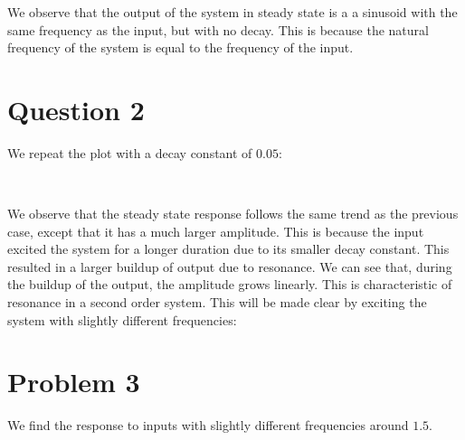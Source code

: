\documentclass[11pt]{article}
\begin{document}
	
		
    We observe that the output of the system in steady state is a a sinusoid
with the same frequency as the input, but with no decay. This is because
the natural frequency of the system is equal to the frequency of the
input.

	

	
		
    \section{Question 2}\label{question-2}

We repeat the plot with a decay constant of \(0.05\):

	

	

    \begin{center}
    \end{center}
    { \hspace*{\fill} \\}
    
	
		
    We observe that the steady state response follows the same trend as the
previous case, except that it has a much larger amplitude. This is
because the input excited the system for a longer duration due to its
smaller decay constant. This resulted in a larger buildup of output due
to resonance. We can see that, during the buildup of the output, the
amplitude grows linearly. This is characteristic of resonance in a
second order system. This will be made clear by exciting the system with
slightly different frequencies:

	

	
		
    \section{Problem 3}\label{problem-3}

We find the response to inputs with slightly different frequencies
around \(1.5\).

	

	
		
	
	
		
	
		
			
		
	
		
			
		
	
\end{document}
